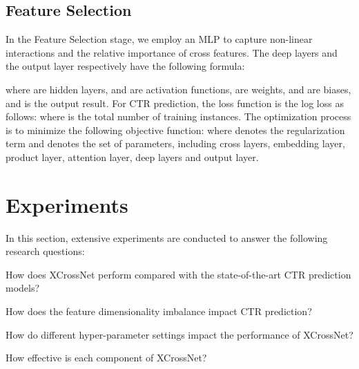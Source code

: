 \documentclass[letterpaper]{article} \usepackage{aaai21}  \usepackage{times}  \usepackage{helvet} \usepackage{courier}  \usepackage[hyphens]{url}  \usepackage{graphicx} \urlstyle{rm} \def\UrlFont{\rm}  \usepackage{natbib}  \usepackage{caption} \frenchspacing  \setlength{\pdfpagewidth}{8.5in}  \setlength{\pdfpageheight}{11in}  \usepackage{graphicx}
\begin{document}
\subsection{Feature Selection}

In the Feature Selection stage, we employ an MLP to capture non-linear interactions and the relative importance of cross features. The deep layers and the output layer respectively have the following formula: 
\begin{small}
	
\end{small}where  are hidden layers,  and  are activation functions,  are weights, and  are biases, and  is the output result. For CTR prediction, the loss function is the log loss as follows:
where  is the total number of training instances. The optimization process is to minimize the following objective function: 
where  denotes the regularization term and  denotes the set of parameters, including cross layers, embedding layer, product layer, attention layer, deep layers and output layer.

\vspace{-0.1cm}
\section{Experiments}

In this section, extensive experiments are conducted to answer the following research questions:

\begin{description}
	\vspace{-0.1cm}
	\item[RQ1:] How does XCrossNet perform compared with the state-of-the-art CTR prediction models?
	\vspace{-0.1cm}
	\item[RQ2:] How does the feature dimensionality imbalance impact CTR prediction?
	\vspace{-0.1cm}
	\item[RQ3:] How do different hyper-parameter settings impact the performance of XCrossNet?
	\vspace{-0.1cm}
	\item[RQ4:] How effective is each component of XCrossNet?

\end{description}
\end{document}
